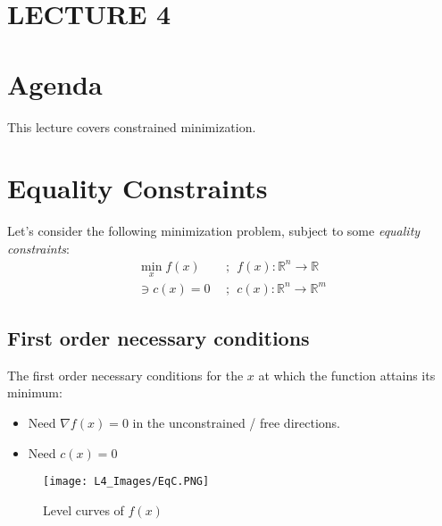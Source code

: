 \newpage
\section*{LECTURE 4}

\section{Agenda}
This lecture covers constrained minimization.

\section{Equality Constraints}
Let's consider the following minimization problem, subject to some \textit{equality constraints}: 
\begin{align}
    \min_x f(x) \ \ &; \ \ f(x) : \mathbb{R}^n \longrightarrow \mathbb{R} \\
    \ni c(x) = 0 \ \ &; \ \ c(x) :  \mathbb{R}^n \longrightarrow \mathbb{R}^m
\end{align}

\subsection{First order necessary conditions}
The first order necessary conditions for the $x$ at which the function attains its minimum:
\begin{itemize}
    \item Need $\nabla f(x) = 0$ in the unconstrained / free directions. 
    \item Need $c(x)=0$
\end{itemize}

\begin{figure}
    \centering
    \texttt{[image: L4\_Images/EqC.PNG]}
    \caption{Level curves of $f(x)$}
    \label{fig:l4f1}
\end{figure}

